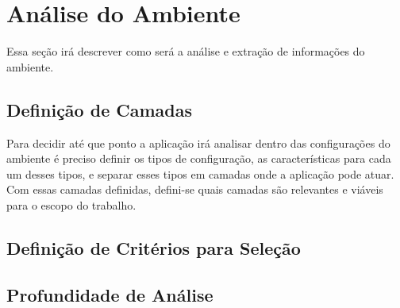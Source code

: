 \section{Análise do Ambiente}
Essa seção irá descrever como será a análise e extração de informações do ambiente. 


\subsection{Definição de Camadas}
Para decidir até que ponto a aplicação irá analisar dentro das configurações
do ambiente é preciso definir os tipos de configuração, as características para
cada um desses tipos, e separar esses tipos em camadas onde a aplicação pode atuar.
Com essas camadas definidas, defini-se quais camadas são relevantes e viáveis
para o escopo do trabalho.

\subsection{Definição de Critérios para Seleção}
\subsection{Profundidade de Análise}

